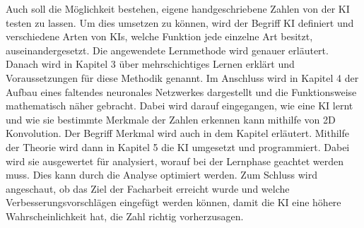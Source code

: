 \documentclass[11pt]{article}
\begin{document}
Auch soll die Möglichkeit bestehen, eigene handgeschriebene Zahlen von der KI testen zu lassen. Um dies umsetzen zu können, wird der Begriff KI definiert und
verschiedene Arten von KIs, welche Funktion jede einzelne Art besitzt, auseinandergesetzt. Die angewendete Lernmethode wird genauer erläutert.
Danach wird in Kapitel 3 über mehrschichtiges Lernen erklärt und Voraussetzungen für diese Methodik genannt. Im Anschluss wird in Kapitel 4
der Aufbau eines faltendes neuronales Netzwerkes dargestellt und die Funktionsweise mathematisch näher gebracht. Dabei wird darauf eingegangen, wie eine KI
lernt und wie sie bestimmte Merkmale der Zahlen erkennen kann mithilfe von 2D Konvolution. Der Begriff Merkmal wird auch in dem Kapitel erläutert.
Mithilfe der Theorie wird dann in Kapitel 5 die KI umgesetzt und programmiert. Dabei wird sie ausgewertet für analysiert, worauf bei der Lernphase
geachtet werden muss. Dies kann durch die Analyse optimiert werden. Zum Schluss wird angeschaut, ob das Ziel der Facharbeit erreicht wurde und welche
Verbesserungsvorschlägen eingefügt werden können, damit die KI eine höhere Wahrscheinlichkeit hat, die Zahl richtig vorherzusagen.
\end{document}
